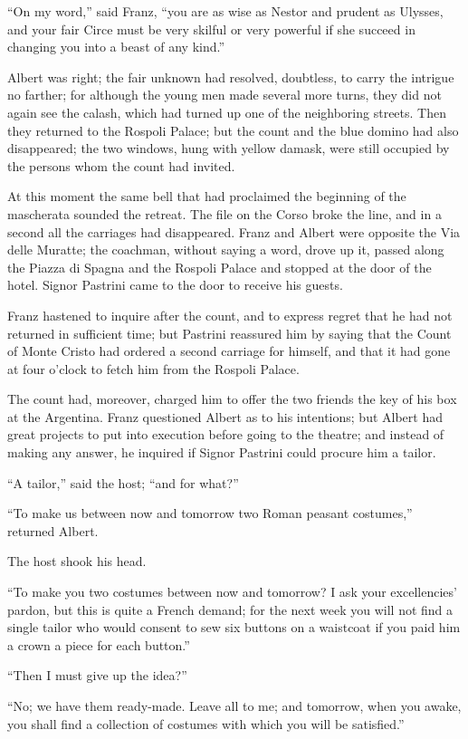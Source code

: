 “On my word,” said Franz, “you are as wise as Nestor and prudent as
Ulysses, and your fair Circe must be very skilful or very powerful if
she succeed in changing you into a beast of any kind.”

Albert was right; the fair unknown had resolved, doubtless, to carry
the intrigue no farther; for although the young men made several more
turns, they did not again see the calash, which had turned up one of
the neighboring streets. Then they returned to the Rospoli Palace; but
the count and the blue domino had also disappeared; the two windows,
hung with yellow damask, were still occupied by the persons whom the
count had invited.

At this moment the same bell that had proclaimed the beginning of the
mascherata sounded the retreat. The file on the Corso broke the line,
and in a second all the carriages had disappeared. Franz and Albert
were opposite the Via delle Muratte; the coachman, without saying a
word, drove up it, passed along the Piazza di Spagna and the Rospoli
Palace and stopped at the door of the hotel. Signor Pastrini came to
the door to receive his guests.

Franz hastened to inquire after the count, and to express regret that
he had not returned in sufficient time; but Pastrini reassured him by
saying that the Count of Monte Cristo had ordered a second carriage for
himself, and that it had gone at four o’clock to fetch him from the
Rospoli Palace.

The count had, moreover, charged him to offer the two friends the key
of his box at the Argentina. Franz questioned Albert as to his
intentions; but Albert had great projects to put into execution before
going to the theatre; and instead of making any answer, he inquired if
Signor Pastrini could procure him a tailor.

“A tailor,” said the host; “and for what?”

“To make us between now and tomorrow two Roman peasant costumes,”
returned Albert.

The host shook his head.

“To make you two costumes between now and tomorrow? I ask your
excellencies’ pardon, but this is quite a French demand; for the next
week you will not find a single tailor who would consent to sew six
buttons on a waistcoat if you paid him a crown a piece for each
button.”

“Then I must give up the idea?”

“No; we have them ready-made. Leave all to me; and tomorrow, when you
awake, you shall find a collection of costumes with which you will be
satisfied.”

